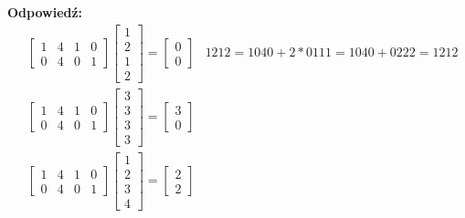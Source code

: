 \documentclass[a4paper,12pt]{article}
\theoremstyle{definition}%
\theoremstyle{definition}
\theoremstyle{problem}
\begin{document}
\begin{enumerate}[label=\alph*)]
\textbf{Odpowiedź: }\begin{align*}
&\begin{bmatrix}
1&4&1&0\\0&4&0&1
\end{bmatrix}\begin{bmatrix}
1\\2\\1\\2
\end{bmatrix}=\begin{bmatrix}
0\\0
\end{bmatrix}&1212=1040+2*0111=1040+0222=1212\\
&\begin{bmatrix}
1&4&1&0\\0&4&0&1
\end{bmatrix}\begin{bmatrix}
3\\3\\3\\3
\end{bmatrix}=\begin{bmatrix}
3\\0
\end{bmatrix}\\
&\begin{bmatrix}
1&4&1&0\\0&4&0&1
\end{bmatrix}\begin{bmatrix}
1\\2\\3\\4
\end{bmatrix}=\begin{bmatrix}
2\\2
\end{bmatrix}
\end{align*}
\end{enumerate}
\end{document}

